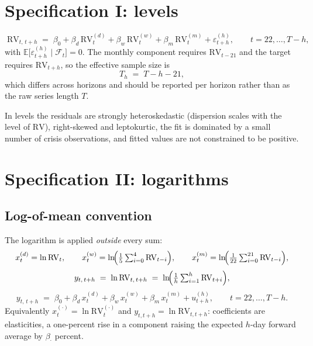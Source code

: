 \documentclass[11pt,a4paper]{article}
\newcommand{\RV}{\mathrm{RV}}
\newcommand{\E}{\mathbb{E}}
\newcommand{\Fset}{\mathcal{F}}
\begin{document}
\section{Specification I: levels}
\label{sec:raw}

\begin{equation}
  \boxed{\;
  \RV_{t,\,t+h}
  \;=\;\beta_{0}
  +\beta_{d}\,\RV^{(d)}_{t}
  +\beta_{w}\,\RV^{(w)}_{t}
  +\beta_{m}\,\RV^{(m)}_{t}
  +\varepsilon^{(h)}_{t+h},
  \qquad t=22,\dots,T-h,\;}
  \label{eq:har-raw}
\end{equation}
with $\E\bigl[\varepsilon^{(h)}_{t+h}\mid\Fset_t\bigr]=0$. The monthly component requires
$\RV_{t-21}$ and the target requires $\RV_{t+h}$, so the effective sample size is
\begin{equation}
  T_h \;=\; T-h-21,
  \label{eq:Th}
\end{equation}
which differs across horizons and should be reported per horizon rather than as the raw
series length $T$.

In levels the residuals are strongly heteroskedastic (dispersion scales with the level of
$\RV$), right-skewed and leptokurtic, the fit is dominated by a small number of crisis
observations, and fitted values are not constrained to be positive.

\section{Specification II: logarithms}
\label{sec:log}

\subsection{Log-of-mean convention}

The logarithm is applied \emph{outside} every sum:
\begin{equation}
  x^{(d)}_t=\ln \RV_t,\qquad
  x^{(w)}_t=\ln\!\Bigl(\tfrac{1}{5}\textstyle\sum_{i=0}^{4}\RV_{t-i}\Bigr),\qquad
  x^{(m)}_t=\ln\!\Bigl(\tfrac{1}{22}\textstyle\sum_{i=0}^{21}\RV_{t-i}\Bigr),
  \label{eq:log-regressors}
\end{equation}
\begin{equation}
  y_{t,\,t+h}\;=\;\ln \RV_{t,\,t+h}\;=\;\ln\!\Bigl(\tfrac{1}{h}\textstyle\sum_{i=1}^{h}\RV_{t+i}\Bigr),
  \label{eq:log-target}
\end{equation}
\begin{equation}
  \boxed{\;
  y_{t,\,t+h}
  \;=\;\beta_{0}
  +\beta_{d}\,x^{(d)}_{t}
  +\beta_{w}\,x^{(w)}_{t}
  +\beta_{m}\,x^{(m)}_{t}
  +u^{(h)}_{t+h},
  \qquad t=22,\dots,T-h.\;}
  \label{eq:har-log}
\end{equation}
Equivalently $x^{(\cdot)}_t=\ln \RV^{(\cdot)}_t$ and $y_{t,t+h}=\ln \RV_{t,t+h}$: coefficients
are elasticities, a one-percent rise in a component raising the expected $h$-day forward
average by $\beta_{\cdot}$ percent.
\end{document}
